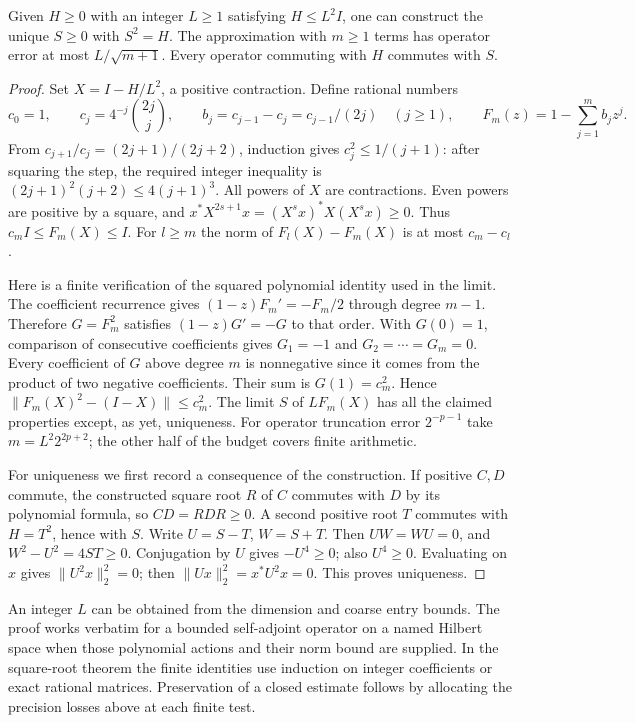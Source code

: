 \begin{theorem}\label{thm:q-sqrt}
Given \(H\ge0\) with an integer \(L\ge1\) satisfying
\(H\le L^2 I\), one can construct the unique \(S\ge0\) with \(S^2=H\).
The approximation with \(m\ge1\) terms has operator error at most
\(L/\sqrt{m+1}\). Every operator commuting with \(H\) commutes with \(S\).
\end{theorem}
\begin{proof}
Set \(X=I-H/L^2\), a positive contraction. Define rational numbers
\[
 c_0=1,\qquad c_j=4^{-j}{2j\choose j},\qquad
 b_j=c_{j-1}-c_j=c_{j-1}/(2j)\quad(j\ge1),
 \qquad F_m(z)=1-\sum_{j=1}^m b_jz^j.
\]
From \(c_{j+1}/c_j=(2j+1)/(2j+2)\), induction gives
\(c_j^2\le 1/(j+1)\): after squaring the step, the required integer
inequality is \((2j+1)^2(j+2)\le4(j+1)^3\).
All powers of \(X\) are contractions. Even powers are positive by a
square, and \(x^*X^{2s+1}x=(X^s x)^*X(X^s x)\ge0\). Thus
\(c_m I\le F_m(X)\le I\). For \(l\ge m\) the norm of
\(F_l(X)-F_m(X)\) is at most \(c_m-c_l\).

Here is a finite verification of the squared polynomial identity used
in the limit. The coefficient recurrence gives
\((1-z)F_m'=-F_m/2\) through degree \(m-1\).
Therefore \(G=F_m^2\) satisfies \((1-z)G'=-G\) to that order.
With \(G(0)=1\), comparison of consecutive coefficients gives
\(G_1=-1\) and \(G_2=\cdots=G_m=0\).
Every coefficient of \(G\) above degree \(m\) is nonnegative since it
comes from the product of two negative coefficients. Their sum is
\(G(1)=c_m^2\). Hence \(\|F_m(X)^2-(I-X)\|\le c_m^2\).
The limit \(S\) of \(L F_m(X)\) has all the claimed properties except,
as yet, uniqueness. For operator truncation error \(2^{-p-1}\) take
\(m=L^2 2^{2p+2}\); the other half of the budget covers finite arithmetic.

For uniqueness we first record a consequence of the construction.
If positive \(C,D\) commute, the constructed square root \(R\) of \(C\)
commutes with \(D\) by its polynomial formula, so \(CD=RDR\ge0\).
A second positive root \(T\) commutes with \(H=T^2\), hence with \(S\).
Write \(U=S-T\), \(W=S+T\). Then \(UW=WU=0\), and
\(W^2-U^2=4ST\ge0\). Conjugation by \(U\) gives \(-U^4\ge0\);
also \(U^4\ge0\). Evaluating on \(x\) gives \(\|U^2x\|_2^2=0\);
then \(\|Ux\|_2^2=x^*U^2x=0\). This proves uniqueness.
\end{proof}

An integer \(L\) can be obtained from the dimension and coarse entry
bounds. The proof works verbatim for a bounded self-adjoint operator on
a named Hilbert space when those polynomial actions and their norm bound
are supplied. In the square-root theorem the finite identities use
induction on integer coefficients or exact rational matrices. Preservation
of a closed estimate follows by allocating the precision losses above
at each finite test.

